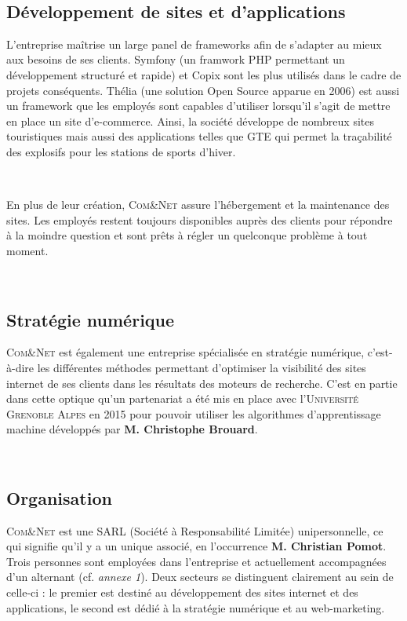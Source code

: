 \documentclass[12pt]{article}
\begin{document}
\

\subsection{Développement de sites et d'applications}

L'entreprise maîtrise un large panel de frameworks afin de s'adapter au mieux aux besoins de ses clients. \textsf{Symfony} (un framwork \textsf{PHP} permettant un développement structuré et rapide) et \textsf{Copix} sont les plus utilisés dans le cadre de projets conséquents. \textsf{Thélia} (une solution Open Source apparue en 2006) est aussi un framework que les employés sont capables d'utiliser lorsqu'il s'agit de mettre en place un site d'e-commerce. Ainsi, la société développe de nombreux sites touristiques mais aussi des applications telles que \textsc{GTE} qui permet la traçabilité des explosifs pour les stations de sports d'hiver.

\

En plus de leur création, \textsc{Com\&Net} assure l'hébergement et la maintenance des sites. Les employés restent toujours disponibles auprès des clients pour répondre à la moindre question et sont prêts à régler un quelconque problème à tout moment.

\

\subsection{Stratégie numérique}

\textsc{Com\&Net} est également une entreprise spécialisée en stratégie numérique, c'est-à-dire les différentes méthodes permettant d'optimiser la visibilité des sites internet de ses clients dans les résultats des moteurs de recherche. C'est en partie dans cette optique qu'un partenariat a été mis en place avec l'\textsc{Université Grenoble Alpes} en 2015 pour pouvoir utiliser les algorithmes d'apprentissage machine développés par \textbf{M. Christophe Brouard}.

\

\subsection{Organisation}

\textsc{Com\&Net} est une \textsf{SARL} (Société à Responsabilité Limitée) unipersonnelle, ce qui signifie qu'il y a un unique associé, en l'occurrence \textbf{M. Christian Pomot}. Trois personnes sont employées dans l'entreprise et actuellement accompagnées d'un alternant (cf. \textsl{annexe 1}). Deux secteurs se distinguent clairement au sein de celle-ci : le premier est destiné au développement des sites internet et des applications, le second est dédié à la stratégie numérique et au web-marketing.
\end{document}

